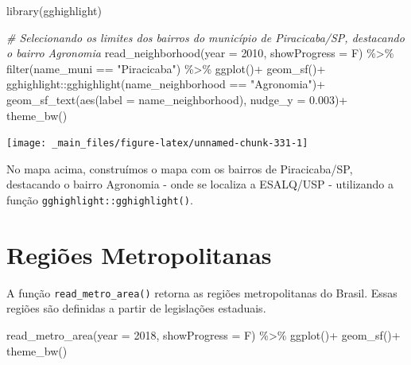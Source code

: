\documentclass[
  brazilian,
]{book}
\newenvironment{Shaded}{\begin{snugshade}}{\end{snugshade}}
\newcommand{\AttributeTok}[1]{\textcolor[rgb]{0.77,0.63,0.00}{#1}}
\newcommand{\CommentTok}[1]{\textcolor[rgb]{0.56,0.35,0.01}{\textit{#1}}}
\newcommand{\DecValTok}[1]{\textcolor[rgb]{0.00,0.00,0.81}{#1}}
\newcommand{\FloatTok}[1]{\textcolor[rgb]{0.00,0.00,0.81}{#1}}
\newcommand{\FunctionTok}[1]{\textcolor[rgb]{0.00,0.00,0.00}{#1}}
\newcommand{\NormalTok}[1]{#1}
\newcommand{\SpecialCharTok}[1]{\textcolor[rgb]{0.00,0.00,0.00}{#1}}
\newcommand{\StringTok}[1]{\textcolor[rgb]{0.31,0.60,0.02}{#1}}
\begin{document}
\begin{Shaded}
\begin{Highlighting}[]
\FunctionTok{library}\NormalTok{(gghighlight)}

\CommentTok{\# Selecionando os limites dos bairros do município de Piracicaba/SP, destacando o bairro Agronomia}
\FunctionTok{read\_neighborhood}\NormalTok{(}\AttributeTok{year =} \DecValTok{2010}\NormalTok{,}
                  \AttributeTok{showProgress =}\NormalTok{ F) }\SpecialCharTok{\%\textgreater{}\%} 
  \FunctionTok{filter}\NormalTok{(name\_muni }\SpecialCharTok{==} \StringTok{"Piracicaba"}\NormalTok{) }\SpecialCharTok{\%\textgreater{}\%}
  \FunctionTok{ggplot}\NormalTok{()}\SpecialCharTok{+}
  \FunctionTok{geom\_sf}\NormalTok{()}\SpecialCharTok{+}
\NormalTok{  gghighlight}\SpecialCharTok{::}\FunctionTok{gghighlight}\NormalTok{(name\_neighborhood }\SpecialCharTok{==} \StringTok{"Agronomia"}\NormalTok{)}\SpecialCharTok{+}
  \FunctionTok{geom\_sf\_text}\NormalTok{(}\FunctionTok{aes}\NormalTok{(}\AttributeTok{label =}\NormalTok{ name\_neighborhood), }\AttributeTok{nudge\_y =} \FloatTok{0.003}\NormalTok{)}\SpecialCharTok{+}  
  \FunctionTok{theme\_bw}\NormalTok{()}
\end{Highlighting}
\end{Shaded}

\begin{center}\texttt{[image: \_main\_files/figure-latex/unnamed-chunk-331-1]} \end{center}

No mapa acima, construímos o mapa com os bairros de Piracicaba/SP, destacando o bairro Agronomia - onde se localiza a ESALQ/USP - utilizando a função \texttt{gghighlight::gghighlight()}.

\hypertarget{regiuxf5es-metropolitanas}{%
\section{Regiões Metropolitanas}\label{regiuxf5es-metropolitanas}}

A função \texttt{read\_metro\_area()} retorna as regiões metropolitanas do Brasil. Essas regiões são definidas a partir de legislações estaduais.

\begin{Shaded}
\begin{Highlighting}[]
\FunctionTok{read\_metro\_area}\NormalTok{(}\AttributeTok{year =} \DecValTok{2018}\NormalTok{,}
                \AttributeTok{showProgress =}\NormalTok{ F) }\SpecialCharTok{\%\textgreater{}\%} 
  \FunctionTok{ggplot}\NormalTok{()}\SpecialCharTok{+}
  \FunctionTok{geom\_sf}\NormalTok{()}\SpecialCharTok{+}
  \FunctionTok{theme\_bw}\NormalTok{()}
\end{Highlighting}
\end{Shaded}
\end{document}
